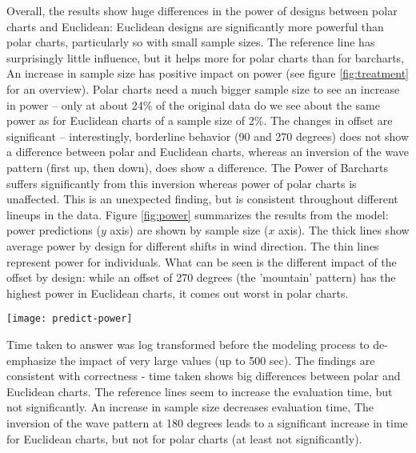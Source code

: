 Overall, the results show huge differences in the power of designs between polar charts and Euclidean: Euclidean designs are significantly more powerful than polar charts, particularly so with small sample sizes. The reference line has surprisingly little influence, but it helps more for  polar charts than for barcharts,
An increase in sample size has positive impact on power (see figure \ref{fig:treatment} for an overview). Polar charts need a much bigger sample size to see an increase in power -- only at about 24\% of the original data do we see about the same power as for Euclidean charts of a sample size of 2\%.
The  changes in offset are significant -- interestingly, borderline behavior (90 and 270 degrees) does not show a difference between polar and Euclidean charts, whereas an inversion of the wave pattern (first up, then down), does show a difference. The Power of Barcharts suffers significantly  from this inversion whereas power of polar charts is unaffected. This is an unexpected finding, but is consistent throughout different lineups in the data. Figure \ref{fig:power} summarizes the results from the model: power predictions ($y$ axis) are shown by sample size ($x$ axis). The thick lines show average power by design for different shifts in wind direction. The thin lines represent power for individuals. What can be seen is the different impact of the offset by design: while  an offset of 270 degrees (the 'mountain' pattern) has the highest power in Euclidean charts, it comes out worst in polar charts.

\begin{figure*}[htbp] %
   \centering
   \texttt{[image: predict-power]} 
   \caption{Predicted Power of designs.  The thin lines and the points on $y$ axis show  variability due to individuals' abilities. The saturated lines show average predicted power for each of the designs.}
   \label{fig:power}
\end{figure*}

Time taken to answer was log transformed before the modeling process to de-emphasize the impact of very large values (up to 500 sec). The findings are consistent with correctness - time taken shows big differences between polar and Euclidean charts. The reference lines seem to increase the evaluation time, but not significantly. An increase in sample size decreases evaluation time, The inversion of the wave pattern at 180 degrees leads to a significant increase in time for Euclidean charts, but not for polar charts (at least not significantly). 


